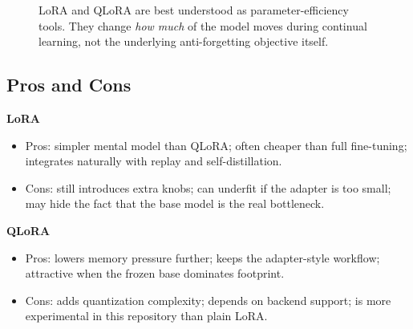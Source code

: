 \begin{figure}[h]
\centering
{}
\caption{LoRA and QLoRA are best understood as parameter-efficiency tools. They change \emph{how much} of the model moves during continual learning, not the underlying anti-forgetting objective itself.}
\end{figure}

\subsection{Pros and Cons}
\textbf{LoRA}
\begin{itemize}
  \item Pros: simpler mental model than QLoRA; often cheaper than full fine-tuning; integrates naturally with replay and self-distillation.
  \item Cons: still introduces extra knobs; can underfit if the adapter is too small; may hide the fact that the base model is the real bottleneck.
\end{itemize}

\textbf{QLoRA}
\begin{itemize}
  \item Pros: lowers memory pressure further; keeps the adapter-style workflow; attractive when the frozen base dominates footprint.
  \item Cons: adds quantization complexity; depends on backend support; is more experimental in this repository than plain LoRA.
\end{itemize}

